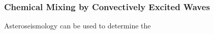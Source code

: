 {\color{purple}
\subsubsection{Chemical Mixing by Convectively Excited Waves}
}

Asteroseismology can be used to determine the 

